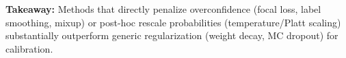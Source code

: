 \textbf{Takeaway:} Methods that directly penalize overconfidence (focal loss, label smoothing, mixup) or post-hoc rescale probabilities (temperature/Platt scaling) substantially outperform generic regularization (weight decay, MC dropout) for calibration.

